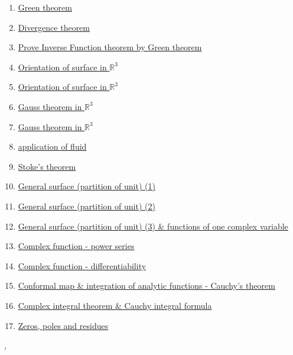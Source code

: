 \documentclass[11pt]{article}
\renewcommand{\today}{\shortmonthname[\the\month] \the \day,  \the\year}
\begin{document}
\begin{enumerate}
	\item \href{https://mp.weixin.qq.com/s/hWZqkCh-U-84YFBAlxCxfw}{Green theorem}	%
	\item \href{https://mp.weixin.qq.com/s/B9rRDwt1c_qbpvo4HAfr7Q}{Divergence theorem}	%
	\item \href{https://mp.weixin.qq.com/s/jl5Dm-h0FOb-LnGLHCnoWw}{Prove Inverse Function theorem by Green theorem}	%
	\item \href{https://mp.weixin.qq.com/s/ZhvRDHR2Qr1fAesaBAMjZQ}{Orientation of surface in $\mathbb{R}^3$ }	%
	\item \href{https://mp.weixin.qq.com/s/lH_4M5iuhdUYWTifm2XJ8w}{Orientation of surface in $\mathbb{R}^3$ }	%
	\item \href{https://mp.weixin.qq.com/s/2ndGfaeBQaUMIG_yTid1tg}{Gauss theorem in $\mathbb{R}^3$ }	%
	\item \href{https://mp.weixin.qq.com/s/zqPCUM7cgoBiJM8JPcGegg}{Gauss theorem in $\mathbb{R}^3$ }	%
	\item \href{URL}{application of fluid}	%
	\item \href{URL}{Stoke's theorem}	%
	\item \href{URL}{General surface (partition of unit) (1)}	%
	\item \href{URL}{General surface (partition of unit) (2)}	%
	\item \href{URL}{General surface (partition of unit) (3) \& functions of one complex variable}	%
	\item \href{URL}{Complex function - power series}	%
	\item \href{URL}{Complex function - differentiability}	%
	\item \href{URL}{Conformal map \& integration of analytic functions - Cauchy's theorem}	%
	\item \href{URL}{Complex integral theorem \& Cauchy integral formula}	%
	\item \href{URL}{Zeros, poles and residues}	%
\end{enumerate}


%
\begin{flushright}
	\tiny \today 
\end{flushright}

\end{document}
